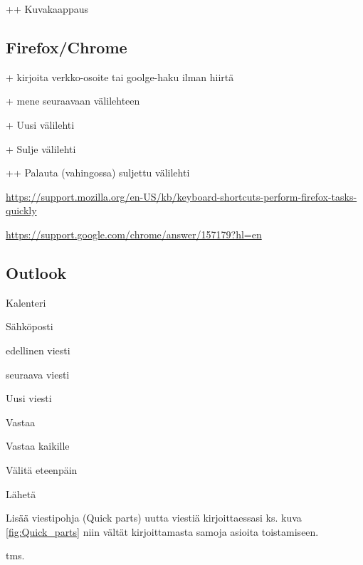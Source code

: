 \documentclass[a4paper,12pt]{scrartcl}
\begin{document}
+\keys{\shift}+ Kuvakaappaus

\subsection{Firefox/Chrome}

+ kirjoita verkko-osoite tai goolge-haku ilman hiirtä

+ mene seuraavaan välilehteen

+ Uusi välilehti

+ Sulje välilehti

++ Palauta (vahingossa) suljettu välilehti



\url{https://support.mozilla.org/en-US/kb/keyboard-shortcuts-perform-firefox-tasks-quickly}





\url{https://support.google.com/chrome/answer/157179?hl=en}


\subsection{Outlook}

 Kalenteri

 Sähköposti

\keys{\ctrl + ,} edellinen viesti

 seuraava viesti

 Uusi viesti

 Vastaa

 Vastaa kaikille

 Välitä eteenpäin

\keys{\ctrl + \return} Lähetä

\medskip

Lisää viestipohja (Quick parts) uutta viestiä kirjoittaessasi ks. kuva \ref{fig:Quick_parts}  niin vältät kirjoittamasta samoja asioita toistamiseen.

 tms.

\end{document}
